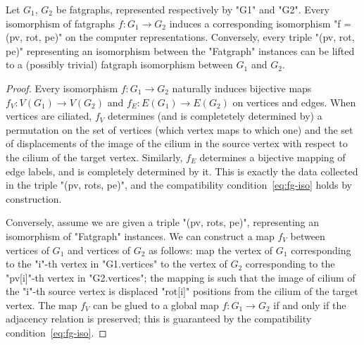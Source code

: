 \begin{lemma}
  Let $G_1$, $G_2$ be fatgraphs, represented respectively by "G1" and
  "G2". Every isomorphism of fatgraphs $f: G_1 \to G_2$ induces a
  corresponding isomorphism "f = (pv, rot, pe)" on the computer
  representations. Conversely, every triple "(pv, rot, pe)"
  representing an isomorphism between the "Fatgraph" instances can be
  lifted to a (possibly trivial) fatgraph isomorphism between $G_1$
  and $G_2$.
\end{lemma}
\begin{proof}
  Every isomorphism $f: G_1 \to G_2$ naturally induces bijective maps
  $f_V: V(G_1) \to V(G_2)$ and $f_E: E(G_1) \to E(G_2)$ on vertices
  and edges.  When vertices are ciliated, $f_V$ determines (and is
  completetely determined by) a permutation on the set of vertices
  (which vertex maps to which one) and the set of displacements of the image of the
  cilium in the source vertex with respect to the
  cilium of the target vertex.  Similarly, $f_E$ determines a
  bijective mapping of edge labels, and is completely determined by
  it.  This is exactly the data collected in the triple "(pv, rots, pe)", 
  and the compatibility condition~\eqref{eq:fg-iso} holds by
  construction.

  Conversely, assume we are given a triple "(pv, rots, pe)",
  representing an isomorphism of "Fatgraph" instances.  We can
  construct a map $f_V$ between vertices of $G_1$ and vertices of
  $G_2$ as follows: map the vertex of $G_1$ corresponding to the
  "i"-th vertex in "G1.vertices" to the vertex of $G_2$ corresponding
  to the "pv[i]"-th vertex in "G2.vertices"; the mapping is such that
  the image of cilium of the "i"-th source vertex is displaced
  "rot[i]" positions from the cilium of the target vertex.  The map
  $f_V$ can be glued to a global map $f: G_1 \to G_2$ if and only if
  the adjacency relation is preserved; this is guaranteed by the
  compatibility condition~\eqref{eq:fg-iso}.
\end{proof}

